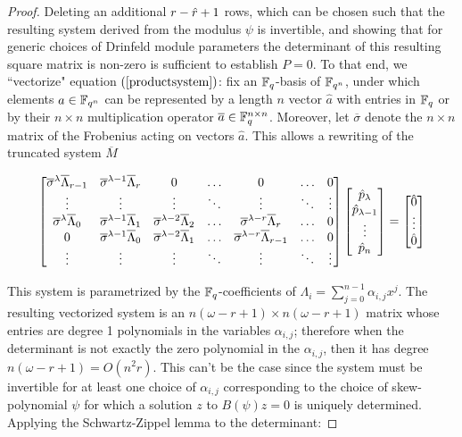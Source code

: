 \begin{proof}
Deleting an additional $r - \hat{r} + 1$ rows, which can be chosen such that the resulting system derived from the modulus $\psi$ is invertible, and showing that for generic choices of Drinfeld module parameters the determinant of this resulting square matrix is non-zero is sufficient to establish $P = 0$. To that end, we ``vectorize" equation $(\ref{productsystem})$: fix an $\mathbb{F}_q$-basis of $\mathbb{F}_{q^n}$, under which elements $a \in \mathbb{F}_{q^n}$ can be represented by a length $n$ vector $\hat{a}$ with entries in $\mathbb{F}_q$ or by their $n\times n$ multiplication operator $\overline{a} \in \mathbb{F}_q^{n \times n}$. Moreover, let $\overline{\sigma}$ denote the $n\times n$ matrix of the Frobenius acting on vectors $\hat{a}$. This allows a rewriting of the truncated system $\overline{M}$

\begin{equation}
    \label{vectorsystem}
    \begin{bmatrix}
    \overline{\sigma}^{\lambda}\overline{\Lambda}_{r - 1} & \overline{\sigma}^{\lambda-1}\overline{\Lambda}_{r} & 0 & \ldots & 0 & \ldots & 0 \\
    \vdots & \vdots & \vdots & \ddots & \vdots & \ddots & \vdots \\
    \overline{\sigma}^{\lambda}\overline{\Lambda}_{0} & \overline{\sigma}^{\lambda -1}\overline{\Lambda}_{1} & \overline{\sigma}^{\lambda - 2}\overline{\Lambda}_{2} & \ldots & \overline{\sigma}^{\lambda - r}\overline{\Lambda}_{r} & \ldots & 0 \\
    0 & \overline{\sigma}^{\lambda - 1}\overline{\Lambda}_{0} & \overline{\sigma}^{\lambda - 2}\overline{\Lambda}_{1} & \ldots & \overline{\sigma}^{\lambda - r}\overline{\Lambda}_{r-1} & \ldots & 0 \\
    \vdots & \vdots & \vdots & \ddots & \vdots & \ddots & \vdots 
    
    
    \end{bmatrix}
    \begin{bmatrix}
    \hat{p}_{\lambda} \\ \hat{p}_{\lambda - 1} \\ \vdots \\ \hat{p}_{n}
    \end{bmatrix}
    = 
    \begin{bmatrix}
     \hat{0} \\ \vdots \\ \hat{0} 
    \end{bmatrix}
\end{equation}

This system is parametrized by the $\mathbb{F}_q$-coefficients of $\Lambda_i = \sum_{j = 0}^{n-1} \alpha_{i,j}x^j$. The resulting vectorized system is an  $ n(\omega - r + 1) \times n(\omega - r + 1)$ matrix whose entries are degree 1 polynomials in the variables $\alpha_{i,j}$; therefore when the determinant is not exactly the zero polynomial in the $\alpha_{i,j}$, then it has degree $n(\omega - r + 1) = O(n^2r)$. This can't be the case since the system must be invertible for at least one choice of $\alpha_{i,j}$ corresponding to the choice of skew-polynomial $\psi$ for which a solution $z$ to $B(\psi)z = 0$ is uniquely determined. Applying the Schwartz-Zippel lemma to the determinant:


\end{proof}
